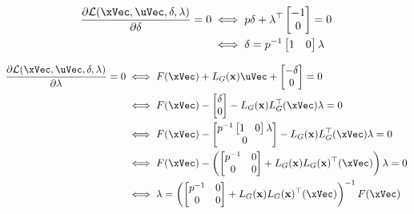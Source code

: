 \begin{align}
    \frac{\partial \mathcal{L}(\xVec, \uVec, \delta, \lambda)}{\partial \delta} = 0 &\iff p\delta +\lambda^{\top}\begin{bmatrix}
                                                                                                                    -1 \\ 0
                                                                                                                 \end{bmatrix} = 0  \notag \\
    &\iff \delta = p^{-1} \begin{bmatrix}
                                1 & 0
                            \end{bmatrix} \lambda   \label{eq:lagrangian_delta_gradient_function}                                                                                                           
\end{align}



\begin{align}
    \frac{\partial \mathcal{L}(\xVec, \uVec, \delta, \lambda)}{\partial \lambda} = 0 &\iff  F(\xVec) + L_G(\mathbf{x})\uVec + \begin{bmatrix} -\delta \\ 0 \end{bmatrix} = 0  \notag \\
    &\iff    F(\xVec) - \begin{bmatrix}  \delta \\ 0 \end{bmatrix} - L_G(\mathbf{x})L_G^{\top}(\xVec)\lambda = 0    \notag \\                                                                                          
    &\iff    F(\xVec) - \begin{bmatrix}  p^{-1} \begin{bmatrix} 1 & 0 \end{bmatrix} \lambda \\ 0 \end{bmatrix} - L_G(\mathbf{x})L_G^{\top}(\xVec)\lambda = 0  \notag \\
    &\iff    F(\xVec) - \left(\begin{bmatrix} p^{-1} & 0 \\ 0 & 0 \end{bmatrix} + L_G(\mathbf{x})L_G(\mathbf{x})^{\top}(\xVec)\right)\lambda = 0  \notag \\     
    &\iff    \lambda = \left(\begin{bmatrix} p^{-1} & 0 \\ 0 & 0 \end{bmatrix} + L_G(\mathbf{x})L_G(\mathbf{x})^{\top}(\xVec)\right)^{-1}F(\xVec) \label{eq:lagrangian_lambda_gradient_function}   
\end{align}

